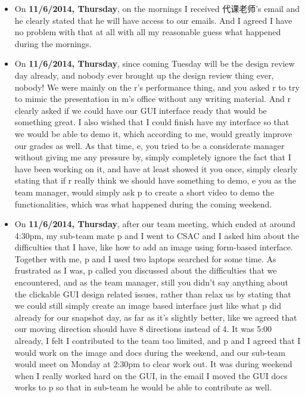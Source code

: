 \documentclass[9pt,b5paper]{article}
\begin{document}
\begin{itemize}
\item On \textbf{11/6/2014, Thursday}, on the mornings I received 代课老师's email and he clearly stated that he will have access to our emails. And I agreed I have no problem with that at all with all my reasonable guess what happened during the mornings.

\item On \textbf{11/6/2014, Thursday}, since coming Tuesday will be the design review day already, and nobody ever brought up the design review thing ever, nobody! We were mainly on the r's performance thing, and you asked r to try to mimic the presentation in m's office without any writing material. And r clearly asked if we could have our GUI interface ready that would be something great. I also wished that I could finish have my interface so that we would be able to demo it, which according to me, would greatly improve our grades as well. As that time, e, you tried to be a considerate manager without giving me any pressure by, simply completely ignore the fact that I have been working on it, and have at least showed it you once, simply clearly stating that if r really think we should have something to demo, e you as the team manager, would simply ask p to create a short video to demo the functionalities, which was what happened during the coming weekend.

\item On \textbf{11/6/2014, Thursday}, after our team meeting, which ended at around 4:30pm, my sub-team mate p and I went to CSAC and I asked him about the difficulties that I have, like how to add an image using form-based interface. Together with me, p and I used two laptops searched for some time. As frustrated as I was, p called you discussed about the difficulties that we encountered, and as the team manager, still you didn't say anything about the clickable GUI design related issues, rather than relax us by stating that we could still simply create an image based interface just like what p did already for our snapshot day, as far as it's slightly better, like we agreed that our moving direction should have 8 directions instead of 4. It was 5:00 already, I felt I contributed to the team too limited, and p and I agreed that I would work on the image and docs during the weekend, and our sub-team would meet on Monday at 2:30pm to clear work out. It was during weekend when I really worked hard on the GUI, in the email I moved the GUI docs works to p so that in sub-team he would be able to contribute as well.


\end{itemize}
\end{document}
